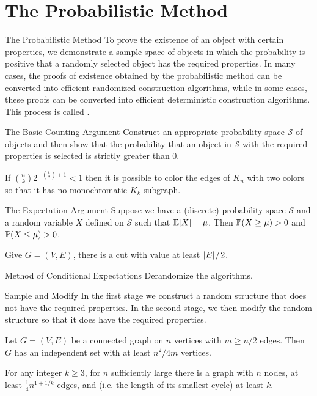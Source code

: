 \documentclass[main.tex]{subfiles}
\begin{document}
\minispacing

\section{The Probabilistic Method}

{\bs The Probabilistic Method} To prove the existence of an object with certain properties, we demonstrate a sample space of objects in which the probability is positive that a randomly selected object has the required properties. In many cases, the proofs of existence obtained by the probabilistic method can be converted into efficient randomized construction algorithms, while in some cases, these proofs can be converted into efficient deterministic construction algorithms. This process is called .

{\bs The Basic Counting Argument} Construct an appropriate probability space $\mathcal{S}$ of objects and then show that the probability that an object in $\mathcal{S}$ with the required properties is selected is strictly greater than $0$.

\begin{theorem}
    If $\binom n k 2^{-\binom k 2 + 1} < 1$ then it is possible to color the edges of $K_n$ with two colors so that it has no monochromatic $K_k$ subgraph.
\end{theorem}

{\bs The Expectation Argument} Suppose we have a (discrete) probability space $\mathcal{S}$ and a random variable $X$ defined on $\mathcal{S}$ such that $\mathbb{E}[X]=\mu$. Then $\mathbb{P}(X\ge \mu) >0$ and $\mathbb{P}(X\le \mu)>0$.

\begin{theorem}
    Give $G=(V,E)$, there is a cut with value at least $|E|\;\!/\;\! 2$.
\end{theorem}

{\bs Method of Conditional Expectations} Derandomize the algorithms.

{\bs Sample and Modify} In the first stage we construct a random structure that does not have the required properties. In the second stage, we then modify the random structure so that it does have the required properties.

\begin{theorem}
    Let $G=(V,E)$ be a connected graph on $n$ vertices with $m\ge n/2$ edges. Then $G$ has an independent set with at least $n^2/4m$ vertices.
\end{theorem}

\begin{theorem}
    For any integer $k\ge 3$, for $n$ sufficiently large there is a graph with $n$ nodes, at least $\frac{1}{4}n^{1+1/k}$ edges, and  (i.e. the length of its smallest cycle) at least $k$.
\end{theorem}
\end{document}
